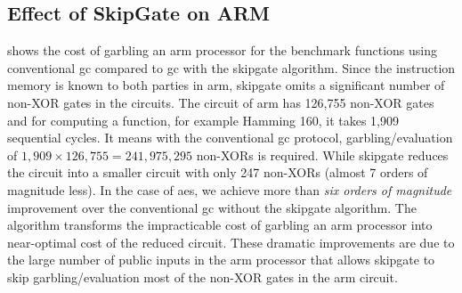 \subsection{Effect of {SkipGate} on ARM}
 shows the cost of garbling an \gls{arm} processor for the benchmark functions using conventional \acrshort{gc} compared to \acrshort{gc} with the \gls{skipgate} algorithm.
Since the instruction memory is known to both parties in \gls{arm}, \gls{skipgate} omits a significant number of non-XOR gates in the circuits.
The circuit of \gls{arm} has 126,755 non-XOR gates and for computing a function, for example Hamming 160, it takes 1,909 sequential cycles.
It means with the conventional \acrshort{gc} protocol, garbling/evaluation of $1,909\times126,755=241,975,295$ non-XORs is required.
While \gls{skipgate} reduces the circuit into a smaller circuit with only 247 non-XORs (almost 7 orders of magnitude less).
In the case of \acrshort{aes}, we achieve more than {\it six orders of magnitude} improvement over the conventional \acrshort{gc} without the \gls{skipgate} algorithm.
The algorithm transforms the impracticable cost of garbling an \gls{arm} processor into near-optimal cost of the reduced circuit.
These dramatic improvements are due to the large number of public inputs in the \gls{arm} processor that allows \gls{skipgate} to skip garbling/evaluation most of the non-XOR gates in the \gls{arm} circuit.

